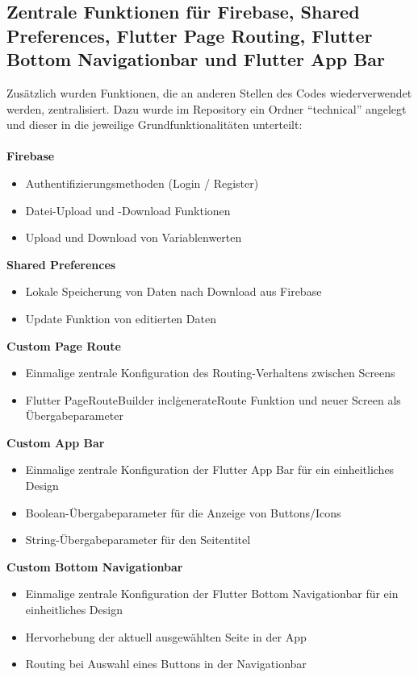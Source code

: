 \subsection{Zentrale Funktionen für Firebase, Shared Preferences, Flutter Page Routing, Flutter Bottom Navigationbar und Flutter App Bar}
Zusätzlich wurden Funktionen, die an anderen Stellen des Codes wiederverwendet werden, zentralisiert.
Dazu wurde im Repository ein Ordner ``technical'' angelegt und dieser in die jeweilige Grundfunktionalitäten unterteilt:
\\
\\
\textbf{Firebase}
\begin{itemize}[itemsep=0pt]
    \item{Authentifizierungsmethoden (Login / Register)} 
	\item{Datei-Upload und -Download Funktionen} 
	\item{Upload und Download von Variablenwerten} 
\end{itemize}
\textbf{Shared Preferences}
\begin{itemize}[itemsep=0pt]
    \item{Lokale Speicherung von Daten nach Download aus Firebase} 
	\item{Update Funktion von editierten Daten} 
\end{itemize}
\textbf{Custom Page Route}
\begin{itemize}[itemsep=0pt]
    \item{Einmalige zentrale Konfiguration des Routing-Verhaltens zwischen Screens} 
	\item{Flutter PageRouteBuilder incl\. generateRoute Funktion und neuer Screen als Übergabeparameter} 
\end{itemize}
\textbf{Custom App Bar}
\begin{itemize}[itemsep=0pt]
    \item{Einmalige zentrale Konfiguration der Flutter App Bar für ein einheitliches Design} 
	\item{Boolean-Übergabeparameter für die Anzeige von Buttons/Icons}
	\item{String-Übergabeparameter für den Seitentitel} 
\end{itemize}
\textbf{Custom Bottom Navigationbar}
\begin{itemize}[itemsep=0pt]
    \item{Einmalige zentrale Konfiguration der Flutter Bottom Navigationbar für ein einheitliches Design} 
	\item{Hervorhebung der aktuell ausgewählten Seite in der App}
	\item{Routing bei Auswahl eines Buttons in der Navigationbar} 
\end{itemize}

